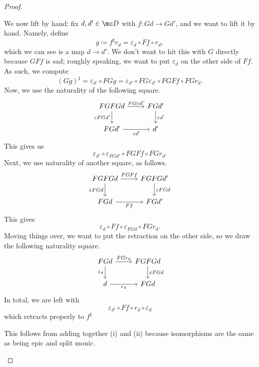 \documentclass[../notes.tex]{subfiles}
\begin{document}
\begin{proof}
\begin{listroman}
		We now lift by hand: fix $d,d'\in\mc D$ with $f\colon Gd\to Gd'$, and we want to lift it by hand. Namely, define
		\[g\coloneqq f^\sharp r_d=\varepsilon_d\circ Ff\circ r_d,\]
		which we can see is a map $d\to d'$. We don't want to hit this with $G$ directly because $GFf$ is sad; roughly speaking, we want to put $\varepsilon_d$ on the other side of $Ff$. As such, we compute
		\[(Gg)^\sharp=\varepsilon_{d'}\circ FGg=\varepsilon_{d'}\circ FG\varepsilon_{d'}\circ FGFf\circ FGr_d.\]
		Now, we use the naturality of the following square.
		\[\begin{tikzcd}
			FGFGd & {FGd'} \\
			{FGd'} & {d'}
			\arrow["{\varepsilon FGd'}"', from=1-1, to=2-1]
			\arrow["{FG\varepsilon d'}", from=1-1, to=1-2]
			\arrow["{\varepsilon d'}", from=1-2, to=2-2]
			\arrow["{\varepsilon d'}"', from=2-1, to=2-2]
		\end{tikzcd}\]
		This gives us
		\[\varepsilon_{d'}\circ\varepsilon_{FGd'}\circ FGFf\circ FGr_d.\]
		Next, we use naturality of another square, as follows.
		\[\begin{tikzcd}
			FGFGd & {FGFGd'} \\
			FGd & {FGd'}
			\arrow["{\varepsilon FGd}"', from=1-1, to=2-1]
			\arrow["FGFf", from=1-1, to=1-2]
			\arrow["Ff"', from=2-1, to=2-2]
			\arrow["{\varepsilon FGd}", from=1-2, to=2-2]
		\end{tikzcd}\]
		This gives
		\[\varepsilon_d\circ Ff\circ \varepsilon_{FGd}\circ FGr_d.\]
		Moving things over, we want to put the retraction on the other side, so we draw the following naturality square.
		\[\begin{tikzcd}
			FGd & FGFGd \\
			d & FGd
			\arrow["{r_d}"', from=2-1, to=2-2]
			\arrow["{FGr_d}", from=1-1, to=1-2]
			\arrow["{\varepsilon_d}"', from=1-1, to=2-1]
			\arrow["{\varepsilon FGd}", from=1-2, to=2-2]
		\end{tikzcd}\]
		In total, we are left with
		\[\varepsilon_{d'}\circ Ff\circ r_d\circ\varepsilon_d\]
		which retracts properly to $f^\sharp$
		\item This follows from adding together (i) and (ii) because isomorphisms are the same as being epic and split monic.
		\qedhere
	\end{listroman}
\end{proof}
\end{document}
